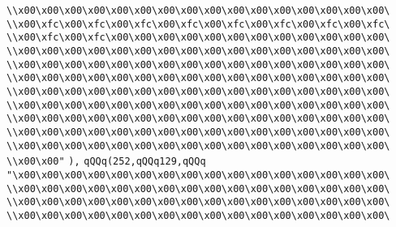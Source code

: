 \verb|\\x00\x00\x00\x00\x00\x00\x00\x00\x00\x00\x00\x00\x00\x00\x00\x00\|\newline
\verb|\\x00\xfc\x00\xfc\x00\xfc\x00\xfc\x00\xfc\x00\xfc\x00\xfc\x00\xfc\|\newline
\verb|\\x00\xfc\x00\xfc\x00\x00\x00\x00\x00\x00\x00\x00\x00\x00\x00\x00\|\newline
\verb|\\x00\x00\x00\x00\x00\x00\x00\x00\x00\x00\x00\x00\x00\x00\x00\x00\|\newline
\verb|\\x00\x00\x00\x00\x00\x00\x00\x00\x00\x00\x00\x00\x00\x00\x00\x00\|\newline
\verb|\\x00\x00\x00\x00\x00\x00\x00\x00\x00\x00\x00\x00\x00\x00\x00\x00\|\newline
\verb|\\x00\x00\x00\x00\x00\x00\x00\x00\x00\x00\x00\x00\x00\x00\x00\x00\|\newline
\verb|\\x00\x00\x00\x00\x00\x00\x00\x00\x00\x00\x00\x00\x00\x00\x00\x00\|\newline
\verb|\\x00\x00\x00\x00\x00\x00\x00\x00\x00\x00\x00\x00\x00\x00\x00\x00\|\newline
\verb|\\x00\x00\x00\x00\x00\x00\x00\x00\x00\x00\x00\x00\x00\x00\x00\x00\|\newline
\verb|\\x00\x00\x00\x00\x00\x00\x00\x00\x00\x00\x00\x00\x00\x00\x00\x00\|\newline
\verb|\\x00\x00"|\newline
\verb|),|\newline
\verb|qQQq(252,qQQq129,qQQq|\newline
\verb|"\x00\x00\x00\x00\x00\x00\x00\x00\x00\x00\x00\x00\x00\x00\x00\x00\|\newline
\verb|\\x00\x00\x00\x00\x00\x00\x00\x00\x00\x00\x00\x00\x00\x00\x00\x00\|\newline
\verb|\\x00\x00\x00\x00\x00\x00\x00\x00\x00\x00\x00\x00\x00\x00\x00\x00\|\newline
\verb|\\x00\x00\x00\x00\x00\x00\x00\x00\x00\x00\x00\x00\x00\x00\x00\x00\|\newline
